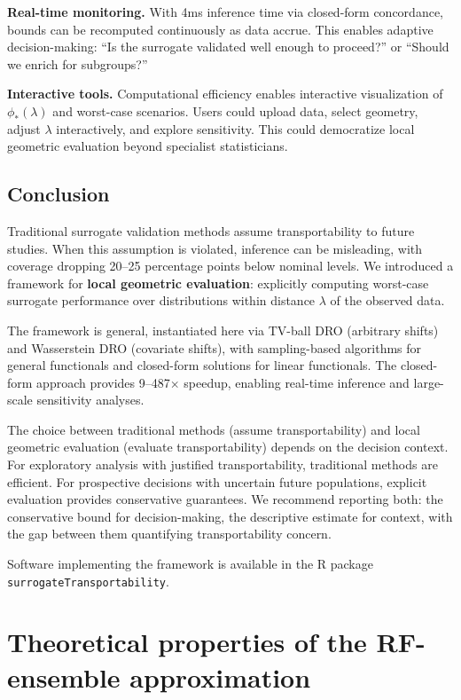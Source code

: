 \documentclass{article}
\begin{document}
\textbf{Real-time monitoring.} With 4ms inference time via closed-form concordance, bounds can be recomputed continuously as data accrue. This enables adaptive decision-making: ``Is the surrogate validated well enough to proceed?'' or ``Should we enrich for subgroups?''

\textbf{Interactive tools.} Computational efficiency enables interactive visualization of $\phi_*(\lambda)$ and worst-case scenarios. Users could upload data, select geometry, adjust $\lambda$ interactively, and explore sensitivity. This could democratize local geometric evaluation beyond specialist statisticians.

\subsection{Conclusion}

Traditional surrogate validation methods assume transportability to future studies. When this assumption is violated, inference can be misleading, with coverage dropping 20--25 percentage points below nominal levels. We introduced a framework for \textbf{local geometric evaluation}: explicitly computing worst-case surrogate performance over distributions within distance $\lambda$ of the observed data.

The framework is general, instantiated here via TV-ball DRO (arbitrary shifts) and Wasserstein DRO (covariate shifts), with sampling-based algorithms for general functionals and closed-form solutions for linear functionals. The closed-form approach provides 9--487$\times$ speedup, enabling real-time inference and large-scale sensitivity analyses.

The choice between traditional methods (assume transportability) and local geometric evaluation (evaluate transportability) depends on the decision context. For exploratory analysis with justified transportability, traditional methods are efficient. For prospective decisions with uncertain future populations, explicit evaluation provides conservative guarantees. We recommend reporting both: the conservative bound for decision-making, the descriptive estimate for context, with the gap between them quantifying transportability concern.

Software implementing the framework is available in the R package \texttt{surrogateTransportability}.

\section{Theoretical properties of the RF-ensemble approximation}
\end{document}

